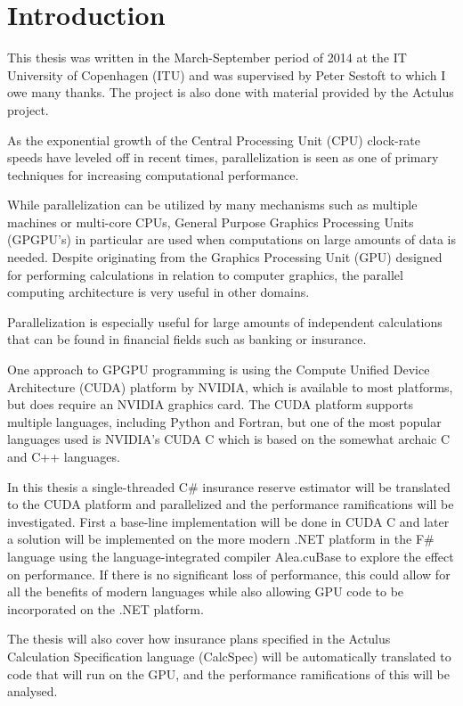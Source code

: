 \section{Introduction}
This thesis was written in the March-September period of 2014 at the IT University of Copenhagen (ITU) and was supervised by Peter Sestoft to which I owe many thanks. 
The project is also done with material provided by the Actulus project.

As the exponential growth of the Central Processing Unit (CPU) clock-rate speeds have leveled off in recent times\cite{ross2008cpu}, parallelization is seen as one of primary techniques for increasing computational performance. 

While parallelization can be utilized by many mechanisms such as multiple machines or multi-core CPUs, General Purpose Graphics Processing Units (GPGPU's) in particular are used when computations on large amounts of data is needed. 
Despite originating from the Graphics Processing Unit (GPU) designed for performing calculations in relation to computer graphics, the parallel computing architecture is very useful in other domains.

Parallelization is especially useful for large amounts of independent calculations that can be found in financial fields such as banking or insurance.

One approach to GPGPU programming is using the Compute Unified Device Architecture (CUDA) platform by NVIDIA, which is available to most platforms, but does require an NVIDIA graphics card.
The CUDA platform supports multiple languages, including Python and Fortran, but one of the most popular languages used is NVIDIA's CUDA C which is based on the somewhat archaic C and C++ languages.

In this thesis a single-threaded C\# insurance reserve estimator will be translated to the CUDA platform and parallelized and the performance ramifications will be investigated.
First a base-line implementation will be done in CUDA C and later a solution will be implemented on the more modern .NET platform in the F\# language using the language-integrated compiler Alea.cuBase to explore the effect on performance.
If there is no significant loss of performance, this could allow for all the benefits of modern languages while also allowing GPU code to be incorporated on the .NET platform.


The thesis will also cover how insurance plans specified in the Actulus Calculation Specification language (CalcSpec) will be automatically translated to code that will run on the GPU, and the performance ramifications of this will be analysed.

